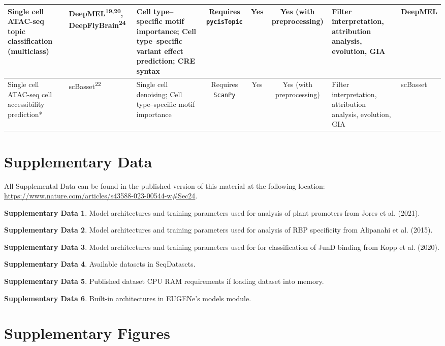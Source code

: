 \begin{landscape}
\begin{table}[ht]
\begin{tabularx}{\linewidth}{|l|l|X|c|c|c|X|l|}
\hline
Single cell ATAC-seq topic classification (multiclass) & DeepMEL\textsuperscript{19,20}, DeepFlyBrain\textsuperscript{24} & Cell type–specific motif importance; Cell type–specific variant effect prediction; CRE syntax & Requires \texttt{pycisTopic} & Yes & Yes (with preprocessing) & Filter interpretation, attribution analysis, evolution, GIA & DeepMEL \\
\hline
Single cell ATAC-seq cell accessibility prediction* & scBasset\textsuperscript{22} & Single cell denoising; Cell type–specific motif importance & Requires \texttt{ScanPy} & Yes & Yes (with preprocessing) & Filter interpretation, attribution analysis, evolution, GIA & scBasset \\
\hline
\end{tabularx}
\end{table}
\end{landscape}

\section{Supplementary Data}
All Supplemental Data can be found in the published version of this material at the following location: \url{https://www.nature.com/articles/s43588-023-00544-w#Sec24}.

\noindent
\textbf{Supplementary Data 1}. Model architectures and training parameters used for analysis of plant promoters from Jores et al. (2021).

\noindent
\textbf{Supplementary Data 2}. Model architectures and training parameters used for analysis of RBP specificity from Alipanahi et al. (2015).

\noindent
\textbf{Supplementary Data 3}. Model architectures and training parameters used for for classification of JunD binding from Kopp et al. (2020).

\noindent
\textbf{Supplementary Data 4}. Available datasets in SeqDatasets.

\noindent
\textbf{Supplementary Data 5}. Published dataset CPU RAM requirements if loading dataset into memory.

\noindent
\textbf{Supplementary Data 6}. Built-in architectures in EUGENe’s models module.


\section{Supplementary Figures}

